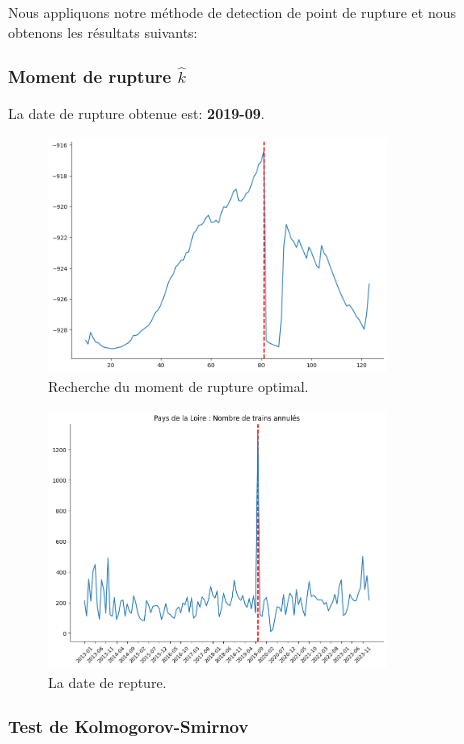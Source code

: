 {Nous appliquons notre méthode de detection de point de rupture et nous obtenons les résultats suivants:

\subsubsection{Moment de rupture $\hat{k}$}

La date de rupture obtenue est: \textbf{2019-09}. 


\begin{figure}[H]
\centering
\includegraphics[width=0.8\textwidth]{image/PL-FIG08.png} 
\caption{Recherche du moment de rupture optimal.}
\label{fig:trains_ANNULES_2}
\end{figure}


\begin{figure}[H]
\centering
\includegraphics[width=0.8\textwidth]{image/PL-FIG09.png} 
\caption{La date de repture.}
\label{fig:trains_ANNULES_2}
\end{figure}




\subsubsection{Test de Kolmogorov-Smirnov}

}
